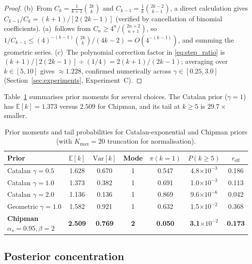 \documentclass[ba]{imsart}
\theoremstyle{plain}
\theoremstyle{definition}
\theoremstyle{remark}
\newcommand{\Eop}{\mathbb{E}}
\newcommand{\reff}{r_{\mathrm{eff}}}
\begin{document}
\begin{proof}
\textup{(b)}~From $C_k = \frac{1}{k+1}\binom{2k}{k}$ and
$C_{k-1} = \frac{1}{k}\binom{2k-2}{k-1}$, a direct calculation gives
$C_{k-1}/C_k = (k+1)/[2(2k-1)]$ (verified by cancellation of binomial
coefficients).
\textup{(a)}~follows from $C_n \geq 4^n/\binom{2n+2}{n+1}$, so
$1/C_{k-1} \leq (4)^{-(k-1)}\binom{2k}{k}/(4k-2) = O(4^{-(k-1)})$, and summing
the geometric series.
\textup{(c)}~The polynomial correction factor in \eqref{eq:step_ratio} is
$(k+1)/[2(2k-1)] \div (1/4) = 2(k+1)/(2k-1)$; averaging over $k \in [5,10]$
gives $\approx 1.228$, confirmed numerically across $\gamma \in [0.25, 3.0]$
(Section~\ref{sec:experiments}, Experiment~C).
\end{proof}

Table~\ref{tab:prior_moments} summarises prior moments for several choices.
The Catalan prior ($\gamma=1$) has $\Eop[k]=1.373$ versus $2.509$ for Chipman,
and its tail at $k\geq 5$ is $29.7\times$ smaller.

\begin{table}[t]
\centering
\caption{Prior moments and tail probabilities for Catalan-exponential and Chipman priors
         (with $K_{\max}=20$ truncation for normalisation).}
\label{tab:prior_moments}
\begin{tabular}{lcccccc}
\toprule
Prior & $\Eop[k]$ & $\mathrm{Var}[k]$ & Mode & $\pi(k=1)$ & $P(k\geq 5)$ & $\reff$ \\
\midrule
Catalan $\gamma=0.5$ & 1.628 & 0.670 & 1 & 0.547 & 4.8$\times10^{-3}$ & 0.186 \\
Catalan $\gamma=1.0$ & 1.373 & 0.382 & 1 & 0.691 & 1.0$\times10^{-3}$ & 0.113 \\
Catalan $\gamma=2.0$ & 1.136 & 0.136 & 1 & 0.869 & 9.6$\times10^{-6}$ & 0.042 \\
Geometric $\gamma=1.0$ & 1.582 & 0.921 & 1 & 0.632 & 1.5$\times10^{-2}$ & 0.368 \\
\textbf{Chipman} $\alpha_s=0.95,\beta=2$ & \textbf{2.509} & \textbf{0.769} & \textbf{2} &
  \textbf{0.050} & \textbf{3.1$\times10^{-2}$} & \textbf{0.173} \\
\bottomrule
\end{tabular}
\end{table}

\subsection{Posterior concentration}
\end{document}
